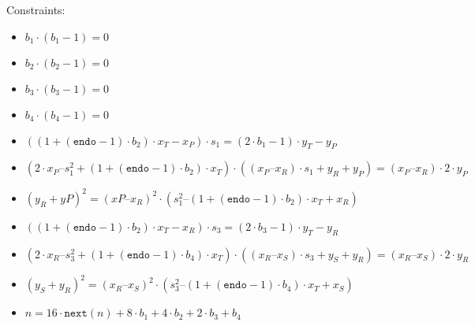 Constraints:
\begin{itemize}
	\item $b_1 \cdot (b_1 - 1) = 0$
	\item $b_2 \cdot (b_2 - 1) = 0$
	\item $b_3 \cdot (b_3 - 1) = 0$
	\item $b_4 \cdot (b_4 - 1) = 0$
	\item $((1 + (\texttt{endo} - 1) \cdot b_2) \cdot x_T - x_P) \cdot s_1 = (2 \cdot b_1 - 1) \cdot y_T - y_P$
	\item $(2 \cdot x_P – s_1^2 + (1 + (\texttt{endo} - 1) \cdot b_2) \cdot x_T) \cdot ((x_P – x_R) \cdot s_1 + y_R + y_P) = (x_P – x_R) \cdot 2 \cdot y_P$
	\item $(y_R + yP)^2 = (xP – x_R)^2 \cdot (s_1^2 – (1 + (\texttt{endo} - 1) \cdot b_2) \cdot x_T + x_R)$
	\item $((1 + (\texttt{endo} - 1) \cdot b_2) \cdot x_T - x_R) \cdot s_3 = (2 \cdot b_3-1) \cdot y_T - y_R$
	\item $(2 \cdot x_R – s_3^2 + (1 + (\texttt{endo} - 1) \cdot b_4) \cdot x_T) \cdot ((x_R – x_S) \cdot s_3 + y_S + y_R) = (x_R – x_S) \cdot 2 \cdot y_R$
	\item $(y_S + y_R)^2 = (x_R – x_S)^2 \cdot (s_3^2 – (1 + (\texttt{endo} - 1) \cdot b_4) \cdot x_T + x_S)$
	\item $n = 16 \cdot \texttt{next}(n) + 8 \cdot b_1 + 4 \cdot b_2 + 2 \cdot b_3 + b_4$
\end{itemize}
